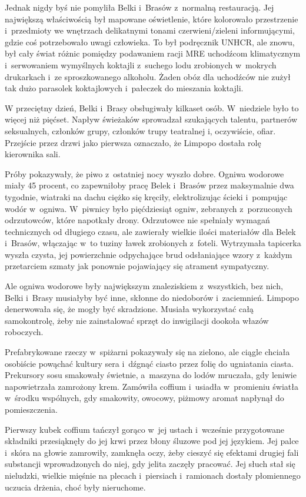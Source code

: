 \documentclass[oneside,polish,11pt,sfheadings]{mwbk}
\begin{document}
Jednak nigdy byś nie pomyliła Belki i~Brasów z~normalną restauracją. Jej
największą właściwością był mapowane oświetlenie, które kolorowało
przestrzenie i~przedmioty we wnętrzach delikatnymi tonami
czerwieni/zieleni informującymi, gdzie coś potrzebowało uwagi człowieka.
To był podręcznik UNHCR, ale znowu, był cały świat różnic pomiędzy
podawaniem racji MRE uchodźcom klimatycznym i~serwowaniem wymyślnych
koktajli z~suchego lodu zrobionych w~mokrych drukarkach i~ze
sproszkowanego alkoholu. Żaden obóz dla uchodźców nie zużył tak dużo
parasolek koktajlowych i~pałeczek do mieszania koktajli.

W przeciętny dzień, Belki i~Brasy obsługiwały kilkaset osób. W~niedziele
było to więcej niż pięćset. Napływ świeżaków sprowadzał szukających
talentu, partnerów seksualnych, członków grupy, członków trupy
teatralnej i, oczywiście, ofiar. Przejście przez drzwi jako pierwsza
oznaczało, że Limpopo dostała rolę kierownika sali.

Próby pokazywały, że piwo z~ostatniej nocy wyszło dobre. Ogniwa wodorowe
miały 45 procent, co zapewniłoby pracę Belek i~Brasów przez maksymalnie
dwa tygodnie, wiatraki na dachu ciężko się kręciły, elektrolizując
ścieki i~pompując wodór w~ogniwa. W~piwnicy było pięćdziesiąt ogniw,
zebranych z~porzuconych odrzutowców, które napotkały drony. Odrzutowce
nie spełniały wymagań technicznych od długiego czasu, ale zawierały
wielkie ilości materiałów dla Belek i~Brasów, włączając w~to tuziny
ławek zrobionych z~foteli. Wytrzymała tapicerka wyszła czysta, jej
powierzchnie odpychające brud odsłaniające wzory z~każdym przetarciem
szmaty jak ponownie pojawiający się atrament sympatyczny.

Ale ogniwa wodorowe były największym znaleziskiem z~wszystkich, bez
nich, Belki i~Brasy musiałyby być inne, skłonne do niedoborów i~zaciemnień. Limpopo denerwowała się, że mogły być skradzione. Musiała
wykorzystać całą samokontrolę, żeby nie zainstalować sprzęt do
inwigilacji dookoła włazów roboczych.

Prefabrykowane rzeczy w~spiżarni pokazywały się na zielono, ale ciągle
chciała osobiście powąchać kultury sera i~dźgnąć ciasto przez folię do
ugniatania ciasta. Prekursory sosu smakowały świetnie, a~maszyna do
lodów mruczała, gdy leniwie napowietrzała zamrożony krem. Zamówiła
coffium i~usiadła w~promieniu światła w~środku wspólnych, gdy smakowity,
owocowy, piżmowy aromat napłynął do pomieszczenia.

Pierwszy kubek coffium tańczył gorąco w~jej ustach i~wcześnie
przygotowane składniki przesiąknęły do jej krwi przez błony śluzowe pod
jej językiem. Jej palce i~skóra na głowie zamrowiły, zamknęła oczy, żeby
cieszyć się efektami drugiej fali substancji wprowadzonych do niej, gdy
jelita zaczęły pracować. Jej słuch stał się nieludzki, wielkie mięśnie
na plecach i~piersiach i~ramionach dostały płomiennego uczucia drżenia,
choć były nieruchome.
\end{document}
